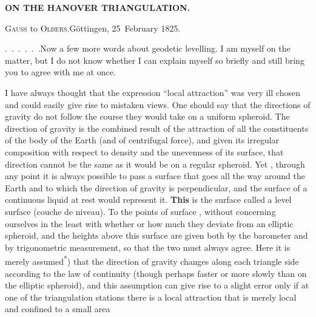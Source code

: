 \noindent\null\hfill{\small\textbf{ON THE HANOVER TRIANGULATION.}}\hfill{}\par\medskip

\begin{center}
\textsc{Gauss} to \textsc{Olbers}.\quad Göttingen, 25~February 1825.
\end{center}

\par\noindent\hspace*{\parindent}\mbox{.\ .\ .\ .\ .\ .}\quad Now a few more words about geodetic levelling.
I am myself  on the matter, but I do not know whether I can explain myself so briefly and still bring you to agree with me at once.

\par\noindent\hspace*{\parindent}I have always thought that the expression “local attraction” was very ill chosen and could easily give rise to mistaken views.
One should say that the directions of gravity do not follow the course they would take on a uniform spheroid.
The direction of gravity is the combined result of the attraction of all the constituents of the body of the Earth (and of centrifugal force), and given its irregular composition with respect to density and the unevenness of its surface, that direction cannot be the same as it would be on a regular spheroid.
Yet , through any point it is always possible to pass a surface that goes all the way around the Earth and to which the direction of gravity is  perpendicular, and the surface of a continuous liquid at rest would represent it.
\textbf{This} is the surface called a level surface (couche de niveau). To the points of  surface , without concerning ourselves in the least with whether or how much they deviate from an elliptic spheroid, and the heights above this surface are given both by the barometer and by trigonometric measurement, so that the two must always agree.
Here it is merely assumed\textsuperscript{*}) that the direction of gravity changes along each triangle side according to the law of continuity (though perhaps faster or more slowly than on the elliptic spheroid), and this assumption can give rise to a slight error only if at one of the triangulation stations there is a  local attraction that is merely local and confined to a small area

